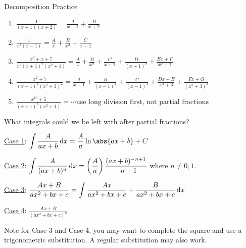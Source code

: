 \begin{Example}{Decomposition Practice}{}
    \begin{enumerate}[label=(\roman*)]
        \item $ \displaystyle \frac{1}{(x+1)(x+2)}=\frac{A}{x+1}+\frac{B}{x+2} $
        \item $ \displaystyle \frac{1}{x^2(x-1)}=\frac{A}{x} +\frac{B}{x^2}+\frac{C}{x-1} $
        \item $ \displaystyle \frac{x^3+x+7}{x^2(x+1)^2(x^2+1)}=\frac{A}{x} +\frac{B}{x^2}+\frac{C}{x+1}
                  +\frac{D}{(x+1)^2}+\frac{Ex+F}{x^2+1} $
        \item $ \displaystyle \frac{x^2+7}{(x-1)^3(x^2+3)^2}
                  =\frac{A}{x-1} +\frac{B}{(x-1)^2}+\frac{C}{(x-1)^3}+\frac{Dx+E}{x^2+3}
                  +\frac{Fx+G}{(x^2+3)^3} $
        \item $ \displaystyle \frac{x^{10}+5}{(x+1)^3(x^2+1)}=\cdots\text{use long division first, not partial
                      fractions} $
    \end{enumerate}
\end{Example}

\begin{Remark}{What integrals could we be left with after partial fractions?}{}

    \underline{Case 1}: $ \displaystyle \int \frac{A}{ax+b} \odif{x} =\frac{A}{a}\ln\abs{ax+b}+C $

    \underline{Case 2}: $ \displaystyle \int \frac{A}{(ax+b)^n} \odif{x} =\left( \frac{A}{a} \right) \frac{(ax+b)^{-n+1}}{-n+1} $
    where $ n\neq 0,1 $.

    \underline{Case 3}: $ \displaystyle \frac{Ax+B}{ax^2+bx+c} =\int \frac{Ax}{ax^2+bx+c} +\frac{B}{ax^2+bx+c} \odif{x}  $

    \underline{Case 4}: $ \displaystyle \frac{Ax+B}{\left( ax^2+bx+c \right)^n} $

    Note for Case 3 and Case 4, you may want to complete the square and use a trigonometric
    substitution. A regular substitution may also work.
\end{Remark}


